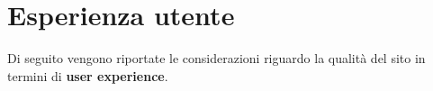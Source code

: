 












\section{Esperienza utente}\label{sec:user-exp}
Di seguito vengono riportate le considerazioni riguardo la qualità del sito in
termini di \textbf{user experience}.

